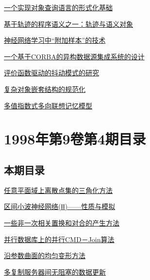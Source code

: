 \documentclass[a4paper]{article}
\begin{document}
\href{http://www.jos.org.cn/ch/reader/download_pdf.aspx?file_no=19980508&year_id=1998&quarter_id=5&falg=1}{一个实现对象查询语言的形式化基础}

\href{http://www.jos.org.cn/ch/reader/download_pdf.aspx?file_no=19980509&year_id=1998&quarter_id=5&falg=1}{基于轨迹的程序语义之一：轨迹与语义对象}

\href{http://www.jos.org.cn/ch/reader/download_pdf.aspx?file_no=19980510&year_id=1998&quarter_id=5&falg=1}{神经网络学习中“附加样本”的技术}

\href{http://www.jos.org.cn/ch/reader/download_pdf.aspx?file_no=19980511&year_id=1998&quarter_id=5&falg=1}{一个基于CORBA的异构数据源集成系统的设计}

\href{http://www.jos.org.cn/ch/reader/download_pdf.aspx?file_no=19980512&year_id=1998&quarter_id=5&falg=1}{评价函数驱动的抖动模式的研究}

\href{http://www.jos.org.cn/ch/reader/download_pdf.aspx?file_no=19980513&year_id=1998&quarter_id=5&falg=1}{复杂对象嵌套结构的规范化}

\href{http://www.jos.org.cn/ch/reader/download_pdf.aspx?file_no=19980514&year_id=1998&quarter_id=5&falg=1}{多值指数式多向联想记忆模型}


\section{\textbf{1998年第9卷第4期目录}}
\subsection{本期目录}
\href{http://www.jos.org.cn/ch/reader/download_pdf.aspx?file_no=19980401&year_id=1998&quarter_id=4&falg=1}{任意平面域上离散点集的三角化方法}

\href{http://www.jos.org.cn/ch/reader/download_pdf.aspx?file_no=19980402&year_id=1998&quarter_id=4&falg=1}{区间小波神经网络(ⅠⅠ)——性质与模拟}

\href{http://www.jos.org.cn/ch/reader/download_pdf.aspx?file_no=19980403&year_id=1998&quarter_id=4&falg=1}{一些非一次相关置换和对合的产生方法}

\href{http://www.jos.org.cn/ch/reader/download_pdf.aspx?file_no=19980404&year_id=1998&quarter_id=4&falg=1}{并行数据库上的并行CMD－Join算法}

\href{http://www.jos.org.cn/ch/reader/download_pdf.aspx?file_no=19980405&year_id=1998&quarter_id=4&falg=1}{沿参数曲面的均匀变形方法}

\href{http://www.jos.org.cn/ch/reader/download_pdf.aspx?file_no=19980406&year_id=1998&quarter_id=4&falg=1}{多复制服务器间无阻塞的数据更新}
\end{document}
